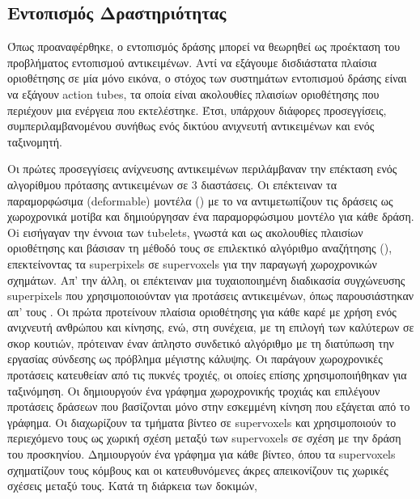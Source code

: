 \subsection{Εντοπισμός Δραστηριότητας}

Όπως προαναφέρθηκε, ο εντοπισμός δράσης μπορεί να θεωρηθεί ως προέκταση του
προβλήματος εντοπισμού αντικειμένων. Αντί να εξάγουμε δισδιάστατα πλαίσια οριοθέτησης  σε μία μόνο
εικόνα, ο στόχος των συστημάτων εντοπισμού δράσης είναι να εξάγουν \en action tubes, \gr τα οποία 
είναι ακολουθίες πλαισίων οριοθέτησης που περιέχουν μια ενέργεια που εκτελέστηκε. Έτσι, υπάρχουν
διάφορες προσεγγίσεις, συμπεριλαμβανομένου συνήθως ενός δικτύου ανιχνευτή αντικειμένων  και ενός ταξινομητή. \par

Οι πρώτες προσεγγίσεις ανίχνευσης αντικειμένων περιλάμβαναν την επέκταση ενός αλγορίθμου  πρότασης αντικειμένων
σε 3 διαστάσεις. Οι \en\cite{6619185} \gr επέκτειναν τα παραμορφώσιμα (\en deformable) \gr μοντέλα (\en\cite{5255236}\gr) με το να αντιμετωπίζουν τις δράσεις  ως
χωροχρονικά μοτίβα και  δημιούργησαν ένα παραμορφώσιμου μοντέλο για κάθε δράση. Oi \en \cite{6909495} \gr εισήγαγαν την έννοια των \en tubelets\gr, γνωστά και ως ακολουθίες
πλαισίων οριοθέτησης και βάσισαν τη μέθοδό τους σε επιλεκτικό αλγόριθμο αναζήτησης (\en\cite{Uijlings13}\gr), επεκτείνοντας τα \en superpixels \gr σε \en supervoxels \gr
για την παραγωγή χωροχρονικών σχημάτων. Απ' την άλλη, οι \en \cite{Oneata} \gr επέκτειναν  μια τυχαιοποιημένη διαδικασία συγχώνευσης \en superpixels \gr 
που χρησιμοποιούνταν  για προτάσεις  αντικειμένων, όπως παρουσιάστηκαν απ' τους \en \cite{Manen:2013:POP:2586117.2587333}\gr.
Οι \en\cite{7298735} \gr  πρώτα προτείνουν πλαίσια οριοθέτησης για κάθε καρέ με χρήση ενός ανιχνευτή ανθρώπου  και κίνησης, ενώ, στη συνέχεια, με τη επιλογή των καλύτερων σε σκορ κουτιών,
πρότειναν έναν άπληστο συνδετικό αλγόριθμο με τη διατύπωση την εργασίας σύνδεσης ως  πρόβλημα  μέγιστης κάλυψης. Οι \en \cite{BMVC2015_177} \gr παράγουν  χωροχρονικές προτάσεις κατευθείαν
από τις πυκνές τροχιές, οι οποίες επίσης χρησιμοποιήθηκαν για ταξινόμηση.
Οι \en\cite{7410734} \gr δημιουργούν ένα γράφημα χωροχρονικής τροχιάς και επιλέγουν προτάσεις δράσεων που βασίζονται μόνο στην εσκεμμένη κίνηση που εξάγεται από το γράφημα.
Οι \en\cite{7410732} \gr διαχωρίζουν  τα τμήματα βίντεο σε \en supervoxels \gr και  χρησιμοποιούν το περιεχόμενο τους ως χωρική σχέση μεταξύ των \en supervoxels \gr σε σχέση με την δράση του προσκηνίου.
Δημιουργούν ένα γράφημα για κάθε βίντεο, όπου τα \en supervoxels \gr σχηματίζουν τους κόμβους και οι  κατευθυνόμενες άκρες απεικονίζουν  τις χωρικές σχέσεις μεταξύ τους. Κατά τη διάρκεια των δοκιμών,
